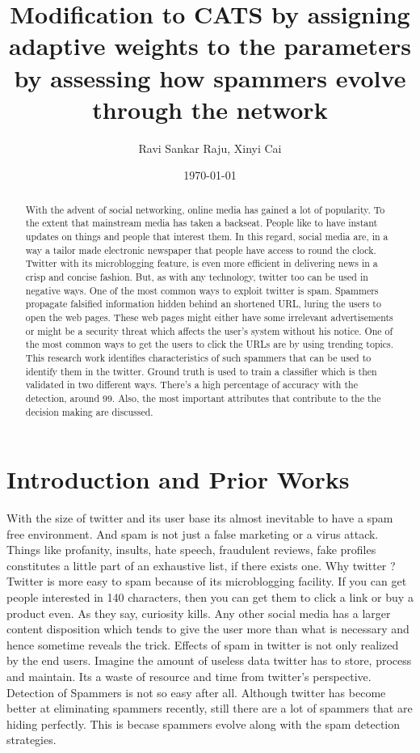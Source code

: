 \documentclass[11pt]{article}
\begin{document}
\title{Modification to CATS by assigning adaptive weights to the parameters by assessing how spammers evolve through the network}

\author{ Ravi Sankar Raju, Xinyi Cai}


\date{\today}

\maketitle

\begin{abstract}
With the advent of social networking, online media has gained a lot of popularity. To the extent that mainstream media has taken a backseat. People like to have instant updates on things and people that interest them. In this regard, social media are, in a way a tailor made electronic newspaper that people have access to round the clock. Twitter with its microblogging feature, is even more efficient in delivering news in a crisp and concise fashion. But, as with any technology, twitter too can be used in negative ways. One of the most common ways to exploit twitter is spam. Spammers propagate falsified information hidden behind an shortened URL, luring the users to open the web pages. These web pages might either have some irrelevant advertisements or might be a security threat which affects the user's system without his notice. One of the most common ways to get the users to click the URLs are by using trending topics. This research work identifies characteristics of such spammers that can be used to identify them in the twitter. Ground truth is used to train a classifier which is then validated in two different ways. There's a high percentage of accuracy with the detection, around 99. Also, the most important attributes that contribute to the the decision making are discussed.
\end{abstract}

\section{Introduction and Prior Works}

With the size of twitter and its user base its almost inevitable to have a spam free environment. And spam is not just a false marketing or a virus attack. Things like profanity, insults, hate speech, fraudulent reviews, fake profiles constitutes a little part of an exhaustive list, if there exists one. Why twitter ? Twitter is more easy to spam because of its microblogging facility. If you can get people interested in 140 characters, then you can get them to click a link or buy a product even. As they say, curiosity kills. Any other social media has a larger content disposition which tends to give the user more than what is necessary and hence sometime reveals the trick.
Effects of spam in twitter is not only realized by the end users. Imagine the amount of useless data twitter has to store, process and maintain. Its a waste of resource and time from twitter's perspective. Detection of Spammers is not so easy after all. Although twitter has become better at eliminating spammers recently, still there are a lot of spammers that are hiding perfectly. This is becase spammers evolve along with the spam detection strategies.
\end{document}
